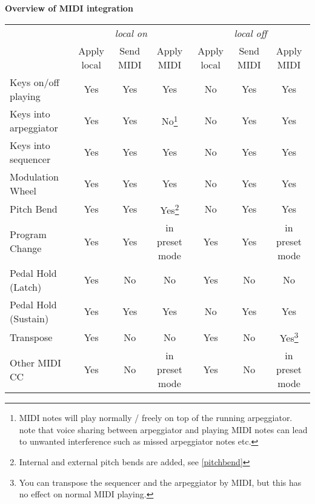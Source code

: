 \begin{samepage}

\textbf{Overview of MIDI integration}

\nopagebreak
\renewcommand{\arraystretch}{1.3}

\begin{longtable}[l]{l|ccc|ccc}
     &
      \multicolumn{3}{c}{\textit{local on}} &
      \multicolumn{3}{c}{\textit{local off}} \\   \cline{2-7} 
    & Apply local & Send MIDI & Apply MIDI & Apply local & Send MIDI & Apply MIDI \\
    \hline
      \vline Keys on/off playing	& Yes & Yes	& Yes & No & Yes & Yes \\
      Keys into arpeggiator	& Yes & Yes	& No\footnote{MIDI notes will play normally / freely on top of the running arpeggiator. note that voice sharing between arpeggiator and playing MIDI notes can lead to unwanted interference such as missed arpeggiator notes etc.} & No & Yes & Yes \\
      Keys into sequencer	& Yes & Yes	& Yes & No & Yes & Yes \\
      Modulation Wheel	& Yes & Yes	& Yes & No & Yes & Yes \\
      Pitch Bend	& Yes & Yes	& Yes\footnote{Internal and external pitch bends are added, see \ref{pitchbend}} & No & Yes & Yes \\
      Program Change	& Yes & Yes	& in preset mode & Yes & Yes & in preset mode \\
      Pedal Hold (Latch)	& Yes & No & No & Yes & No & No \\
      Pedal Hold (Sustain)	& Yes & Yes & Yes & No & Yes & Yes \\
      Transpose & Yes & No & No & Yes & No & Yes\footnote{You can transpose the sequencer and the arpeggiator by MIDI, but this has no effect on normal MIDI playing.} \\
      Other MIDI CC	& Yes & No & in preset mode & Yes & No & in preset mode \\
\end{longtable}

\end{samepage}
